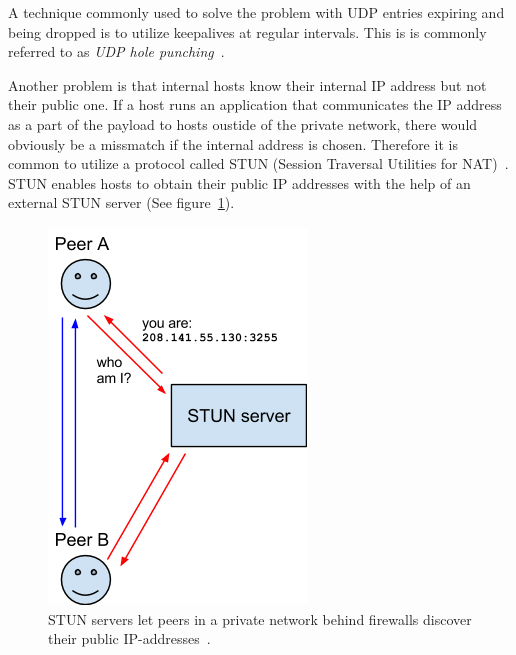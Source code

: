 A technique commonly used to solve the problem with UDP entries expiring and being dropped is to utilize keepalives at regular intervals. This is is commonly referred to as \emph{UDP hole punching}~\cite{UDPHolePunching:Online}.

Another problem is that internal hosts know their internal IP address but not their public one. If a host runs an application that communicates the IP address as a part of the payload to hosts oustide of the private network, there would obviously be a missmatch if the internal address is chosen. Therefore it is common to utilize a protocol called STUN (Session Traversal Utilities for NAT)~\cite{RFC5389:Online}. STUN enables hosts to obtain their public IP addresses with the help of an external STUN server (See figure~\ref{fig:WebRTC - STUN}).

\begin{figure}[htp]
\centering
\includegraphics[width=\textwidth,height=0.2\paperheight,keepaspectratio
]{figures/webrtc-stun}
\caption{STUN servers let peers in a private network behind firewalls discover their public IP-addresses~\cite{WebRTCArchitecture:2014:Online}.}
\label{fig:WebRTC - STUN}
\end{figure}

